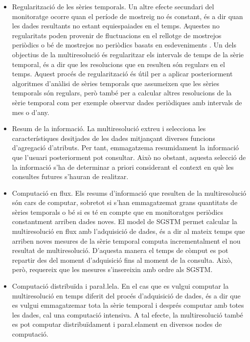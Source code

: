\begin{itemize}
\item Regularització de les sèries temporals. Un altre efecte
  secundari del monitoratge ocorre quan el període de mostreig no és
  constant, és a dir quan les dades resultants no estant equiespaiades
  en el temps. Aquestes no regularitats poden provenir de fluctuacions
  en el rellotge de mostrejos periòdics o bé de mostrejos no periòdics
  basats en esdeveniments \parencite{kopetz11:realtime}. Un dels
  objectius de la multiresolució és regularitzar els intervals de
  temps de la sèrie temporal, és a dir que les resolucions que en
  resulten són regulars en el temps. Aquest procés de regularització
  és útil per a aplicar posteriorment algoritmes d'anàlisi de sèries
  temporals que assumeixen que les sèries temporals són regulars, però
  també per a calcular altres resolucions de la sèrie temporal com per
  exemple observar dades periòdiques amb intervals de mes o d'any.


\item Resum de la informació.  La multiresolució extreu i selecciona
  les característiques desitjades de les dades mitjançant diverses
  funcions d'agregació d'atributs. Per tant, emmagatzema resumidament la
  informació que l'usuari posteriorment pot consultar. Això no
  obstant, aquesta selecció de la informació s'ha de determinar a
  priori considerant el context en què les consultes futures s'hauran
  de realitzar.


\item Computació en flux. Els resums d'informació que resulten de la
  multiresolució són cars de computar, sobretot si s'han emmagatzemat
  grans quantitats de sèries temporals o bé si es té en compte que en
  monitoratges periòdics constantment arriben dades noves. El
  model de \gls{SGSTM} permet calcular la multiresolució en flux amb
  l'adquisició de dades, és a dir al mateix temps que arriben noves
  mesures de la sèrie temporal computa incrementalment el nou resultat
  de multiresolució. D'aquesta manera el temps de còmput es pot
  repartir des del moment d'adquisició fins al moment de la
  consulta. Això, però, requereix que les mesures s'insereixin amb
  ordre als \gls{SGSTM}.

\item Computació distribuïda i para\l.lela. En el cas que es vulgui
  computar la multiresolució en temps diferit del procés d'adquisició
  de dades, és a dir que es vulgui emmagatzemar tota la sèrie temporal
  i després computar amb totes les dades, cal una computació
  intensiva. A tal efecte, la multiresolució també es pot computar
  distribuïdament i para\l.elament en diversos nodes de computació.

 
\end{itemize}


